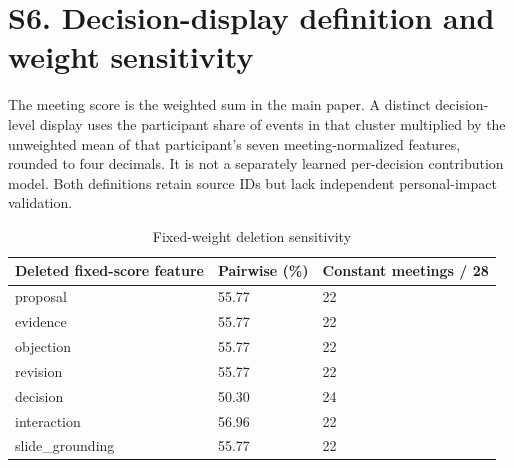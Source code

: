 \documentclass[journal,onecolumn]{IEEEtran}
\begin{document}
\section*{S6. Decision-display definition and weight sensitivity}
The meeting score is the weighted sum in the main paper. A distinct decision-level display uses the participant share of events in that cluster multiplied by the unweighted mean of that participant's seven meeting-normalized features, rounded to four decimals. It is not a separately learned per-decision contribution model. Both definitions retain source IDs but lack independent personal-impact validation.

\begin{table}[htbp]
\centering\footnotesize
\caption{Fixed-weight deletion sensitivity}
\setlength{\tabcolsep}{3pt}
\renewcommand{\arraystretch}{1.15}
\begin{tabular}{p{}p{}p{}}
\toprule
{\raggedright Deleted fixed-score feature\par} & {\raggedright Pairwise (\%)\par} & {\raggedright Constant meetings / 28\par} \\
\midrule
{\raggedright proposal\par} & {\raggedright 55.77\par} & {\raggedright 22\par} \\
{\raggedright evidence\par} & {\raggedright 55.77\par} & {\raggedright 22\par} \\
{\raggedright objection\par} & {\raggedright 55.77\par} & {\raggedright 22\par} \\
{\raggedright revision\par} & {\raggedright 55.77\par} & {\raggedright 22\par} \\
{\raggedright decision\par} & {\raggedright 50.30\par} & {\raggedright 24\par} \\
{\raggedright interaction\par} & {\raggedright 56.96\par} & {\raggedright 22\par} \\
{\raggedright slide\_\allowbreak{}grounding\par} & {\raggedright 55.77\par} & {\raggedright 22\par} \\
\bottomrule
\end{tabular}
\end{table}
\end{document}
